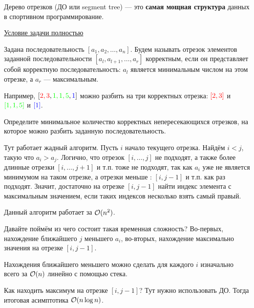
Дерево отрезков (ДО или segment tree) --- это {\bf самая мощная структура} данных в спортивном программирование.


\down

\href{https://codeforces.com/gym/102154/problem/B}{Условие задачи полностью}


\down

Задана последовательность $[a_1, a_2, \dots, a_n]$. Будем называть отрезок элементов заданной последовательности $[a_l, a_{l + 1}, \dots, a_r]$ корректным, если он представляет собой корректную последовательность: $a_l$ является минимальным числом на этом отрезке, а $a_r$ — максимальным.

Например, $[{\color{red}{2,3}}, {\color{green}{1,1,5}}, {\color{blue}{1}}]$ можно разбить на три корректных отрезка: ${\color{red}{[2,3]}}$ и ${\color{green}{[1,1,5]}}$ и ${\color{blue}{[1]}}$.

\down

Определите минимальное количество корректных непересекающихся отрезков, на которое можно разбить заданную последовательность. 

\down

Тут работает жадный алгоритм. Пусть $i$ начало текущего отрезка. Найдём $i < j$, такую что $a_i > a_j$. Логично, что отрезок $[i, \dots, j]$ не подходят, а также более длинные отрезки $[i, \dots, j + 1]$ и т.п. тоже не подходят, так как $a_i$ уже не является минимумом на таком отрезке, а отрезки меньше : $[i, j - 1]$ и т.п. как раз подходят. Значит, достаточно на отрезке $[i, j - 1]$ найти индекс элемента с максимальным значением, если таких индексов несколько взять самый правый.

Данный алгоритм работает за $ \mathcal{O}(n^2)$.

\down

Давайте поймём из чего состоит такая временная сложность? Во-первых, нахождение ближайшего $j$ меньшего $a_i$, во-вторых, нахождение максимально значения на отрезке $[i, j - 1]$.

Нахождения ближайшего меньшего можно сделать для каждого $i$ изначально всего за $ \mathcal{O}(n)$ линейно с помощью стека.

Как находить максимум на отрезке $[i, j - 1]$? Тут нужно использовать ДО. Тогда итоговая асимптотика $ \mathcal{O}(n \log n)$.

\pagebreak	

